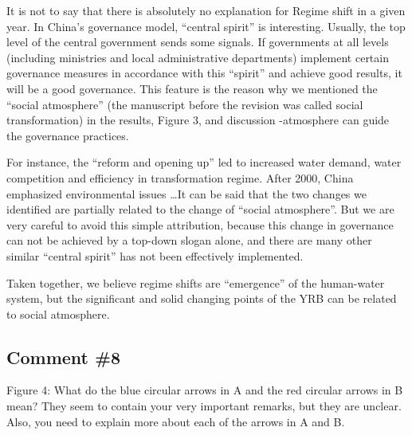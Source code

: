 \AR*{} It is not to say that there is absolutely no explanation for Regime shift in a given year. In China's governance model, ``central spirit'' is interesting. Usually, the top level of the central government sends some signals. If governments at all levels (including ministries and local administrative departments) implement certain governance measures in accordance with this ``spirit'' and achieve good results, it will be a good governance. This feature is the reason why we mentioned the ``social atmosphere'' (the manuscript before the revision was called social transformation) in the results, Figure 3, and discussion -atmosphere can guide the governance practices.

\AR*{} For instance, the ``reform and opening up'' led to increased water demand, water competition and efficiency in transformation regime. After 2000, China emphasized environmental issues \dots It can be said that the two changes we identified are partially related to the change of ``social atmosphere''. But we are very careful to avoid this simple attribution, because this change in governance can not be achieved by a top-down slogan alone, and there are many other similar ``central spirit'' has not been effectively implemented.

\AR*{} Taken together, we believe regime shifts are ``emergence'' of the human-water system, but the significant and solid changing points of the YRB can be related to social atmosphere.

\subsection{Comment \#8}
\RC{} Figure 4: What do the blue circular arrows in A and the red circular arrows in B mean? They seem to contain your very important remarks, but they are unclear. Also, you need to explain more about each of the arrows in A and B.

